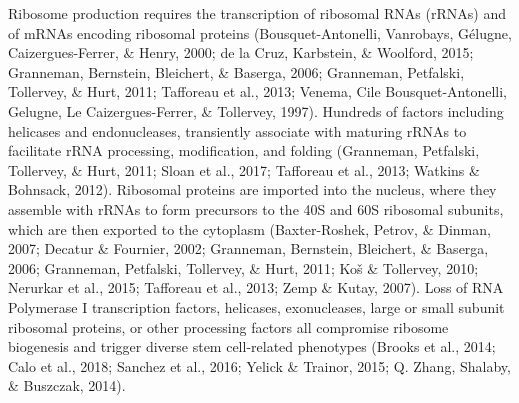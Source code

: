 \documentclass[12pt,oneside]{reedthesis}
\begin{document}
Ribosome production requires the transcription of ribosomal RNAs (rRNAs) and of mRNAs encoding ribosomal proteins (Bousquet-Antonelli, Vanrobays, Gélugne, Caizergues-Ferrer, \& Henry, 2000; de la Cruz, Karbstein, \& Woolford, 2015; Granneman, Bernstein, Bleichert, \& Baserga, 2006; Granneman, Petfalski, Tollervey, \& Hurt, 2011; Tafforeau et al., 2013; Venema, Cile Bousquet-Antonelli, Gelugne, Le Caizergues-Ferrer, \& Tollervey, 1997). Hundreds of factors including helicases and endonucleases, transiently associate with maturing rRNAs to facilitate rRNA processing, modification, and folding (Granneman, Petfalski, Tollervey, \& Hurt, 2011; Sloan et al., 2017; Tafforeau et al., 2013; Watkins \& Bohnsack, 2012). Ribosomal proteins are imported into the nucleus, where they assemble with rRNAs to form precursors to the 40S and 60S ribosomal subunits, which are then exported to the cytoplasm (Baxter-Roshek, Petrov, \& Dinman, 2007; Decatur \& Fournier, 2002; Granneman, Bernstein, Bleichert, \& Baserga, 2006; Granneman, Petfalski, Tollervey, \& Hurt, 2011; Koš \& Tollervey, 2010; Nerurkar et al., 2015; Tafforeau et al., 2013; Zemp \& Kutay, 2007). Loss of RNA Polymerase I transcription factors, helicases, exonucleases, large or small subunit ribosomal proteins, or other processing factors all compromise ribosome biogenesis and trigger diverse stem cell-related phenotypes (Brooks et al., 2014; Calo et al., 2018; Sanchez et al., 2016; Yelick \& Trainor, 2015; Q. Zhang, Shalaby, \& Buszczak, 2014).
\end{document}
